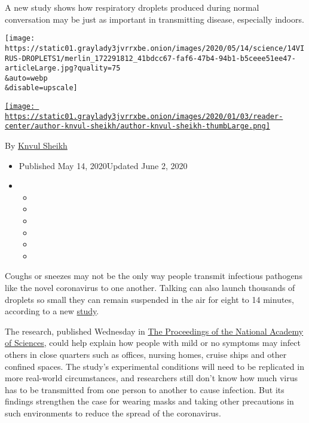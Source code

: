 A new study shows how respiratory droplets produced during normal
conversation may be just as important in transmitting disease,
especially indoors.

\texttt{[image: https://static01.graylady3jvrrxbe.onion/images/2020/05/14/science/14VIRUS-DROPLETS1/merlin\_172291812\_41bdcc67-faf6-47b4-94b1-b5ceee51ee47-articleLarge.jpg?quality=75\\\&auto=webp\\\&disable=upscale]}

\href{https://www.nytimes3xbfgragh.onion/by/knvul-sheikh}{\texttt{[image: https://static01.graylady3jvrrxbe.onion/images/2020/01/03/reader-center/author-knvul-sheikh/author-knvul-sheikh-thumbLarge.png]}}

By \href{https://www.nytimes3xbfgragh.onion/by/knvul-sheikh}{Knvul
Sheikh}

\begin{itemize}
\item
  Published May 14, 2020Updated June 2, 2020
\item
  \begin{itemize}
  \item
  \item
  \item
  \item
  \item
  \item
  \end{itemize}
\end{itemize}

Coughs or sneezes may not be the only way people transmit infectious
pathogens like the novel coronavirus to one another. Talking can also
launch thousands of droplets so small they can remain suspended in the
air for eight to 14 minutes, according to a new
\href{https://www.nytimes3xbfgragh.onion/2020/06/02/health/coronavirus-study.html}{study}.

The research, published Wednesday in
\href{https://www.pnas.org/content/early/2020/05/12/2006874117}{The
Proceedings of the National Academy of Sciences}, could help explain how
people with mild or no symptoms may infect others in close quarters such
as offices, nursing homes, cruise ships and other confined spaces. The
study's experimental conditions will need to be replicated in more
real-world circumstances, and researchers still don't know how much
virus has to be transmitted from one person to another to cause
infection. But its findings strengthen the case for wearing masks and
taking other precautions in such environments to reduce the spread of
the coronavirus.

